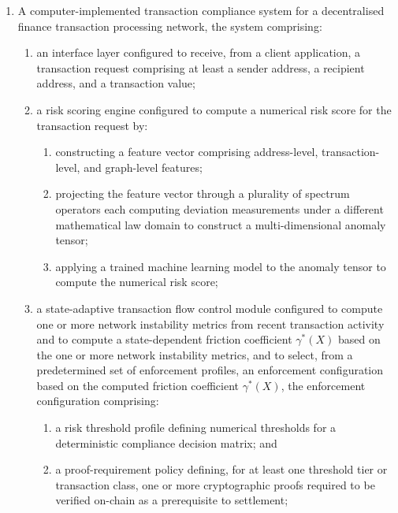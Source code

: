 \documentclass[12pt,a4paper]{article}
\begin{document}
\begin{enumerate}[label=\textbf{\arabic*.}]

\item A computer-implemented transaction compliance system for a decentralised
finance transaction processing network, the system comprising:
\begin{enumerate}[label=(\alph*)]

\item an interface layer configured to receive, from a client application,
a transaction request comprising at least a sender address, a recipient
address, and a transaction value;

\item a risk scoring engine configured to compute a numerical risk score
for the transaction request by:
\begin{enumerate}[label=(\roman*)]
  \item constructing a feature vector comprising address-level,
  transaction-level, and graph-level features;
  \item projecting the feature vector through a plurality of spectrum
  operators each computing deviation measurements under a different
  mathematical law domain to construct a multi-dimensional anomaly tensor;
  \item applying a trained machine learning model to the anomaly tensor to
  compute the numerical risk score;
\end{enumerate}

\item a state-adaptive transaction flow control module configured to
compute one or more network instability metrics from recent transaction
activity and to compute a state-dependent friction coefficient
$\gamma^*(X)$ based on the one or more network instability metrics, and to
select, from a predetermined set of enforcement profiles, an enforcement
configuration based on the computed friction coefficient $\gamma^*(X)$,
the enforcement configuration comprising:
\begin{enumerate}[label=(\roman*)]
  \item a risk threshold profile defining numerical thresholds for a
  deterministic compliance decision matrix; and
  \item a proof-requirement policy defining, for at least one threshold tier
  or transaction class, one or more cryptographic proofs required to be
  verified on-chain as a prerequisite to settlement;
\end{enumerate}


\end{enumerate}
\end{enumerate}
\end{document}
